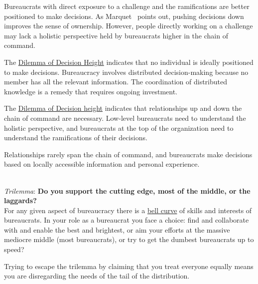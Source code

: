 Bureaucrats with direct exposure to a challenge and the ramifications are better positioned to make decisions. As Marquet~\cite{2013_Marquet} points out, pushing decisions down improves the sense of ownership. However, people directly working on a challenge may lack a holistic perspective held by bureaucrats higher in the chain of command. 

The \hyperref[table:dilemma-org-decisions-low-vs-high]{Dilemma of Decision Height} indicates that no individual is ideally positioned to make decisions. Bureaucracy involves distributed decision-making because no member has all the relevant information. The coordination of distributed knowledge is a remedy that requires ongoing investment.

The \hyperref[table:dilemma-org-decisions-low-vs-high]{Dilemma of Decision height} indicates that relationships up and down the chain of command are necessary. Low-level bureaucrats need to understand the holistic perspective, and bureaucrats at the top of the organization need to understand the ramifications of their decisions.

Relationships rarely span the chain of command, and bureaucrats make decisions based on locally accessible information and personal experience. 



\ \\

\textit{Trilemma}: \textbf{Do you support the cutting edge, most of the middle, or the laggards?}\\
For any given aspect of bureaucracy there is a \href{https://en.wikipedia.org/wiki/Normal_distribution}{bell curve} 
of skills and interests of bureaucrats. In your role as a bureaucrat you face a choice: find and collaborate with and enable the best and brightest, or aim your efforts at the massive mediocre middle (most bureaucrats), or try to get the dumbest bureaucrats up to speed? 

Trying to escape the trilemma by claiming that you treat everyone equally means you are disregarding the needs of the tail of the distribution. 

